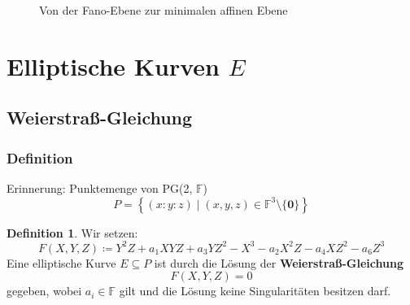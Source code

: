 \documentclass{beamer}
\theoremstyle{plain}
\theoremstyle{definition}
\newtheorem{defn}[thm]{Definition}
\theoremstyle{rem}
\newcommand{\pgtwo}{PG(2, $\mathbb{F}$)\ }
\newcommand{\ftnz}{\mathbb{F}^{3}\setminus\{\boldsymbol 0\}}
\begin{document}
\begin{frame}
\begin{figure}[H]
{{{}}
        }
        \caption{Von der Fano-Ebene zur minimalen affinen Ebene}
    \end{figure}
\end{frame}

\section{Elliptische Kurven $E$}

\subsection{Weierstraß-Gleichung}

\begin{frame}
\frametitle{Definition}
Erinnerung: Punktemenge von \pgtwo
\begin{equation*}
    P = \left\{(x:y:z) \mid (x,y,z) \in \ftnz \right\}
\end{equation*}
\vspace{-6mm}
\begin{defn}
Wir setzen:
\vspace{-3mm}
\begin{equation*}
	    F(X,Y,Z)\coloneqq Y^2Z + a_1XYZ + a_3YZ^2 - X^3 - a_2X^2Z - a_4XZ^2 - a_6Z^3
\end{equation*}
Eine elliptische Kurve $E\subseteq P$ ist durch die Lösung der \textbf{Weierstraß-Gleichung}
\vspace{-3mm}
\begin{equation*}
	    F(X,Y,Z)=0
\end{equation*}
        gegeben, wobei $a_i \in \mathbb{F}$ gilt und die Lösung keine Singularitäten besitzen darf.
\end{defn}
\end{frame}
\end{document}
